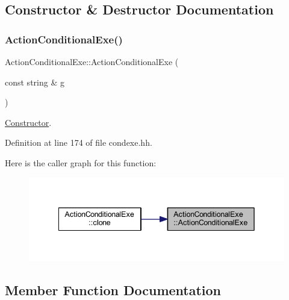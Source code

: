 \subsection{Constructor \& Destructor Documentation}
\mbox{\label{class_action_conditional_exe_a01cbfc30f3bac447a947d2d0d3ef0fd8}} 
\subsubsection{\texorpdfstring{ActionConditionalExe()}{ActionConditionalExe()}}
{\footnotesize\ttfamily Action\+Conditional\+Exe\+::\+Action\+Conditional\+Exe (\begin{DoxyParamCaption}\item[{const string \&}]{g }\end{DoxyParamCaption})\hspace{0.3cm}{\ttfamily [inline]}}



\mbox{\hyperlink{class_constructor}{Constructor}}. 



Definition at line 174 of file condexe.\+hh.

Here is the caller graph for this function\+:
\nopagebreak
\begin{figure}[H]
\begin{center}
\leavevmode
\includegraphics[width=342pt]{class_action_conditional_exe_a01cbfc30f3bac447a947d2d0d3ef0fd8_icgraph}
\end{center}
\end{figure}


\subsection{Member Function Documentation}
\mbox{\label{class_action_conditional_exe_a8625b7608a9c03ab7a70b1a7ae4d34ea}} 
